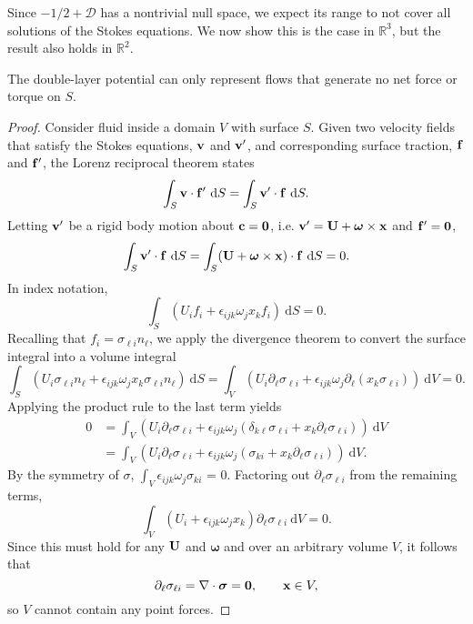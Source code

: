 Since $-1/2 + \mathcal{D}$ has a nontrivial null space, we expect its range to not cover all solutions of the Stokes equations. We now show this is the case in $\mathbb{R}^3$, but the result also holds in $\mathbb{R}^2$. 
\begin{proposition}\label{prop:net_force}
The double-layer potential can only represent flows that generate no net force or torque on $S$.
\end{proposition}
\begin{proof}
	Consider fluid inside a domain $V$ with surface $S$. Given two velocity fields that satisfy the Stokes equations, ${\mathbf{v}}$ and ${\mathbf{v}}'$, and corresponding surface traction, ${\mathbf{f}}$ and ${\mathbf{f}}'$, the Lorenz reciprocal theorem states \cite{Karrila1991}
	\begin{equation}\label{eq:lorenz} \int_S {\mathbf{v}}\cdot{\mathbf{f}}'~\text{d}S = \int_S {\mathbf{v}}'\cdot{\mathbf{f}}~\text{d}S.\end{equation}
 Letting ${\mathbf{v}}'$ be a rigid body motion about ${\mathbf{c}} = \mathbf{0}$, i.e. ${\mathbf{v}}' = {\mathbf{U}} + \bm{\omega}\times{\mathbf{x}}$ and ${\mathbf{f}}' = \mathbf{0}$,
	\[ \int_S  {\mathbf{v}}' \cdot {\mathbf{f}}~\text{d}S = \int_S ({\mathbf{U}} + \bm{\omega}\times{\mathbf{x}})\cdot {\mathbf{f}}~\text{d}S = 0.\]
	In index notation,
	\[ \int_S ( U_i f_i + \epsilon_{ijk} \omega_j x_k f_i)~\text{d}S= 0.\]
	Recalling that $f_i = \sigma_{\ell i}n_\ell$,  we apply the divergence theorem to convert the surface integral into a volume integral
	\[ \int_S (U_i \sigma_{\ell i}n_\ell + \epsilon_{ijk}\omega_j x_k \sigma_{\ell i}n_\ell)~\text{d}S = \int_V (U_i \partial_{\ell} \sigma_{\ell i} + \epsilon_{ijk}\omega_j \partial_\ell(x_k \sigma_{\ell i}))~\text{d}V = 0.\]
	Applying the product rule to the last term yields
	\begin{align*}
		0 & =\int_V (U_i \partial_{\ell} \sigma_{\ell i} + \epsilon_{ijk}\omega_j (\delta_{k\ell} \sigma_{\ell i} + x_k\partial_\ell\sigma_{\ell i}))~\text{d}V\\
		&= \int_V (U_i \partial_{\ell} \sigma_{\ell i} +\epsilon_{ijk}\omega_j (\sigma_{k i} + x_k\partial_\ell\sigma_{\ell i}))~\text{d}V.
	\end{align*}
By the symmetry of $\sigma$,  $\int_V \epsilon_{ijk}\omega_j \sigma_{ki}$ = 0.  Factoring out $\partial_{\ell}\sigma_{\ell i}$ from the remaining terms,
	\[ \int_V (U_i + \epsilon_{ijk}\omega_j x_k)\partial_{\ell}\sigma_{\ell i}~\text{d}V = 0.\]
	Since this must hold for any ${\mathbf{U}}$ and $\bm{\omega}$  and over an arbitrary volume $V$, it follows that
	\begin{equation}\label{eq:stress_div} \partial_{\ell}\sigma_{\ell i} = \nabla\cdot\bm{\sigma}= \mathbf{0}, \qquad {\mathbf{x}}\in V,\end{equation}
	so $V$ cannot contain any point forces. 
	

\end{proof}
